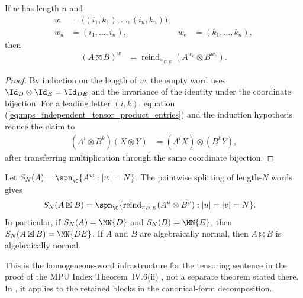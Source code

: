 \begin{lemma}
    \label{thm:mps_eval_word_independent_tensor_product}
    \leanok
    If $w$ has length $n$ and
    \begin{align}
        w   & =\bigl((i_1,k_1),\ldots,(i_n,k_n)\bigr), \\
        w_d & =(i_1,\ldots,i_n),
            &
        w_e & =(k_1,\ldots,k_n),
    \end{align}
    then
    \begin{align}
        (A\boxtimes B)^w
         & =\operatorname{reind}_{\pi_{D,E}}
        \left(A^{w_d}\otimes B^{w_e}\right).
        \label{eq:mps_eval_word_independent_tensor_product}
    \end{align}
\end{lemma}

\begin{proof}\leanok
    By induction on the length of $w$, the empty word uses
    $\Id_D\otimes\Id_E=\Id_{DE}$ and the invariance of the
    identity under the coordinate bijection.  For a leading letter
    $(i,k)$, equation
    (\ref{eq:mps_independent_tensor_product_entries}) and the induction
    hypothesis reduce the claim to
    \begin{align}
        (A^i\otimes B^k)(X\otimes Y)
         & =(A^iX)\otimes(B^kY),
    \end{align}
    after transferring multiplication through the same coordinate bijection.
\end{proof}

\begin{lemma}
    \label{thm:mps_word_span_tensor_product}
    \leanok
    Let $S_N(A)=\spn_{\C}\{A^w:|w|=N\}$.  The pointwise splitting of
    length-$N$ words gives
    \begin{align}
        S_N(A\boxtimes B)
         & =\spn_{\C}\{\operatorname{reind}_{\pi_{D,E}}(A^u\otimes B^v):
        |u|=|v|=N\}.
        \label{eq:mpu_tensor_word_span}
    \end{align}
    In particular, if $S_N(A)=\MN{D}$ and $S_N(B)=\MN{E}$, then
    $S_N(A\boxtimes B)=\MN{DE}$.  If $A$ and $B$ are algebraically normal,
    then $A\boxtimes B$ is algebraically normal.

    This is the homogeneous-word infrastructure for the tensoring sentence in
    the proof of the MPU Index Theorem~IV.6(ii)
    \cite[lines~824--845]{Cirac2017MPU}, not a separate theorem stated there.
    In \cite[Section~2.3, lines~214--245]{Cirac2016MPDO_arXiv}, it applies to the retained blocks in the canonical-form
    decomposition.
\end{lemma}

